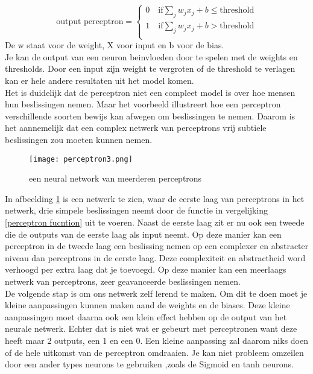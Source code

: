 \[ \text{output perceptron} =
  \begin{cases}
     0 \quad \text{if} \sum_{j}w_{j}x_{j}+b \leq \text{threshold} \\
     1 \quad \text{if} \sum_{j}w_{j}x_{j}+b > \text{threshold} \\
  \end{cases}
\] \label{perceptron fucntion}
\qquad \qquad \quad De w staat voor de weight, X voor input en b voor de bias.\\
\newline
\noindent Je kan de output van een neuron beinvloeden door te spelen met de weights en thresholds. Door een input zijn weight te vergroten of de threshold te verlagen kan er hele andere resultaten uit het model komen\cite{NeuralNetwork1}.\\ 
\newline
Het is duidelijk dat de perceptron niet een compleet model is over hoe mensen hun beslissingen nemen. Maar het voorbeeld illustreert hoe een perceptron verschillende soorten bewijs kan afwegen om beslissingen te nemen. Daarom is het aannemelijk dat een complex netwerk van perceptrons vrij subtiele beslissingen zou moeten kunnen nemen\cite{NeuralNetwork1}.
\begin{figure}[h!]
\centering
\texttt{[image: perceptron3.png]}
\caption{een neural network van meerderen perceptrons}
\label{perceptron3}
\end{figure}
\newline
In afbeelding \ref{perceptron3} is een netwerk te zien, waar de eerste laag van perceptrons in het netwerk, drie simpele beslissingen neemt door de functie in vergelijking \ref{perceptron fucntion} uit te voeren. Naast de eerste laag zit er nu ook een tweede die de outputs van de eerste laag als input neemt. Op deze manier kan een perceptron in de tweede laag een beslissing nemen op een complexer en abstracter niveau dan perceptrons in de eerste laag. Deze complexiteit en abstractheid word verhoogd per extra laag dat je toevoegd. Op deze manier kan een meerlaags netwerk van perceptrons, zeer geavanceerde beslissingen nemen\cite{NeuralNetwork1}\cite{learning}.\\ 
\newline
De volgende stap is om ons netwerk zelf lerend te maken. Om dit te doen moet je kleine aanpassingen kunnen maken aand de weights en de biases. Deze kleine aanpassingen moet daarna ook een klein effect hebben op de output van het neurale netwerk. Echter dat is niet wat er gebeurt met perceptronen want deze heeft maar 2 outputs, een 1 en een 0. Een kleine aanpassing zal daarom niks doen of de hele uitkomst van de perceptron omdraaien. Je kan niet probleem omzeilen door een ander types neurons te gebruiken ,zoals de Sigmoid en tanh neurons.\cite{learning}

